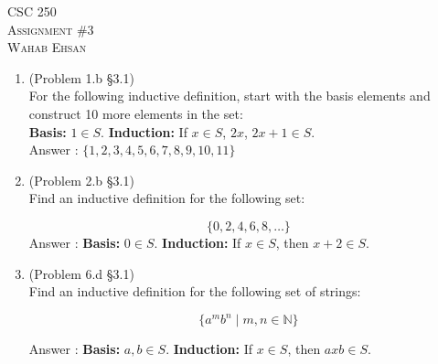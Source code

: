 \documentclass[12pt]{article}
\newcommand{\NN}{\mathbb{N}}
\begin{document}
\begin{center}
\textsc{CSC 250 \\ Assignment \#3}\\
\textsc{Wahab Ehsan}
\end{center}







\begin{enumerate}
\item (Problem 1.b \S 3.1)\\
For the following inductive definition, start with the basis elements and construct 10 more elements in the set:\\

\textbf{Basis: }$1\in S$. \textbf{Induction: }If $x\in S$, $2x$, $2x+1\in S$.
 \\ Answer : $\{1, 2, 3, 4, 5, 6, 7, 8, 9, 10,11\}$










\item (Problem 2.b \S 3.1)\\
Find an inductive definition for the following set:

\[\{0,2,4,6,8,\ldots\}\]
Answer : 
\textbf{Basis: }$0\in S$. \textbf{Induction: }If $x\in S$, then $x+2 \in S$.










\item (Problem 6.d \S 3.1)\\
Find an inductive definition for the following set of strings:

\[\{a^mb^n\mid m,n\in\NN\}\]

Answer :
\textbf{Basis: }$a, b\in S$. \textbf{Induction: }If $x\in S$, then $axb\in S$.










\end{enumerate}
\end{document}
